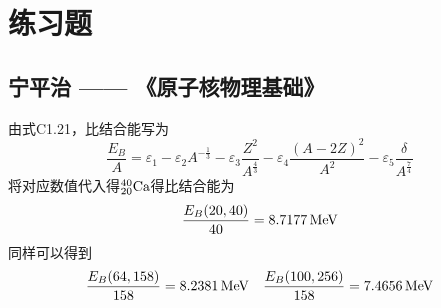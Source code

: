 \chapter{练习题}

\section{宁平治 —— 《原子核物理基础》}

\begin{exercise*}[C.1]
    由式C1.21，比结合能写为
    \begin{equation}
        \frac{E_{B}}{A} =   \varepsilon_1 - \varepsilon_2 A^{-\frac{1}{3}}
                          - \varepsilon_3 \frac{Z^2}{A^{\frac{4}{3}}} 
                          - \varepsilon_4 \frac{(A - 2Z)^2}{A^2}
                          - \varepsilon_5 \frac{\delta}{A^{\frac{7}{4}}}
    \end{equation}
    将对应数值代入得$^{40}_{20}{\rm Ca}$得比结合能为
    \begin{equation*}
        \frac{E_{B}(20, 40)}{40} = 8.7177\, {\rm MeV}
    \end{equation*}
    同样可以得到
    \begin{equation*}
        \frac{E_{B}(64, 158)}{158} = 8.2381\, {\rm MeV}
        \quad
        \frac{E_{B}(100, 256)}{158} = 7.4656\, {\rm MeV}
    \end{equation*}
\end{exercise*}

